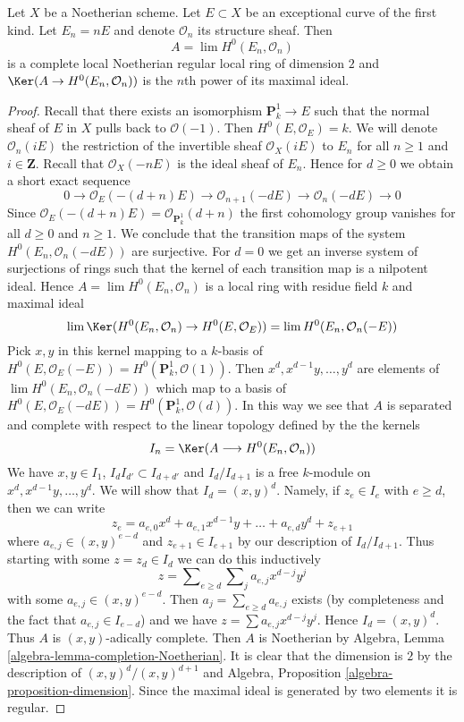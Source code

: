 \begin{lemma}
\label{lemma-exceptional-first-kind-local}
Let $X$ be a Noetherian scheme. Let $E \subset X$ be an
exceptional curve of the first kind. Let $E_n = nE$ and
denote $\mathcal{O}_n$ its structure sheaf. Then
$$
A = \lim H^0(E_n, \mathcal{O}_n)
$$
is a complete local Noetherian regular local ring of dimension $2$
and $\Ker(A \to H^0(E_n, \mathcal{O}_n))$ is the $n$th power of
its maximal ideal.
\end{lemma}

\begin{proof}
Recall that there exists an isomorphism $\mathbf{P}^1_k \to E$
such that the normal sheaf of $E$ in $X$ pulls back to $\mathcal{O}(-1)$.
Then $H^0(E, \mathcal{O}_E) = k$.
We will denote $\mathcal{O}_n(iE)$ the restriction of the invertible
sheaf $\mathcal{O}_X(iE)$ to $E_n$ for all $n \geq 1$ and $i \in \mathbf{Z}$.
Recall that $\mathcal{O}_X(-nE)$ is the ideal sheaf of $E_n$. Hence
for $d \geq 0$ we obtain a short exact sequence
$$
0 \to \mathcal{O}_E(-(d + n)E) \to
\mathcal{O}_{n + 1}(-dE) \to
\mathcal{O}_n(-dE) \to 0
$$
Since $\mathcal{O}_E(-(d + n)E) = \mathcal{O}_{\mathbf{P}^1_k}(d + n)$
the first cohomology group vanishes for all $d \geq 0$ and $n \geq 1$.
We conclude that the transition maps of the system
$H^0(E_n, \mathcal{O}_n(-dE))$ are surjective. For $d = 0$
we get an inverse system of surjections of rings such that the
kernel of each transition map is a nilpotent ideal.
Hence $A = \lim H^0(E_n, \mathcal{O}_n)$ is a local ring
with residue field $k$ and maximal ideal
$$
\lim \Ker(H^0(E_n, \mathcal{O}_n) \to H^0(E, \mathcal{O}_E)) =
\lim H^0(E_n, \mathcal{O}_n(-E))
$$
Pick $x, y$ in this kernel mapping to a $k$-basis of
$H^0(E, \mathcal{O}_E(-E)) = H^0(\mathbf{P}^1_k, \mathcal{O}(1))$.
Then $x^d, x^{d - 1}y, \ldots, y^d$ are
elements of $\lim H^0(E_n, \mathcal{O}_n(-dE))$ which map to a basis
of $H^0(E, \mathcal{O}_E(-dE)) = H^0(\mathbf{P}^1_k, \mathcal{O}(d))$.
In this way we see that $A$ is separated and complete with respect
to the linear topology defined by the the kernels
$$
I_n = \Ker(A \longrightarrow H^0(E_n, \mathcal{O}_n))
$$
We have $x, y \in I_1$, $I_d I_{d'} \subset I_{d + d'}$
and $I_d/I_{d + 1}$ is a free $k$-module on $x^d, x^{d - 1}y, \ldots, y^d$.
We will show that $I_d = (x, y)^d$. Namely, if $z_e \in I_e$ with
$e \geq d$, then we can write
$$
z_e = a_{e, 0} x^d + a_{e, 1} x^{d - 1}y + \ldots + a_{e, d}y^d + z_{e + 1}
$$
where $a_{e, j} \in (x, y)^{e - d}$ and $z_{e + 1} \in I_{e + 1}$
by our description of $I_d/I_{d + 1}$. Thus starting with some
$z = z_d \in I_d$ we can do this inductively
$$
z = \sum\nolimits_{e \geq d} \sum\nolimits_j a_{e, j} x^{d - j} y^j
$$
with some $a_{e, j} \in (x, y)^{e - d}$. Then $a_j = \sum_{e \geq d} a_{e, j}$
exists (by completeness and the fact that $a_{e, j} \in I_{e - d}$)
and we have $z = \sum a_{e, j} x^{d - j} y^j$.
Hence $I_d = (x, y)^d$.
Thus $A$ is $(x, y)$-adically complete. Then $A$ is
Noetherian by Algebra, Lemma \ref{algebra-lemma-completion-Noetherian}.
It is clear that the dimension is $2$ by the description
of $(x, y)^d/(x, y)^{d + 1}$ and
Algebra, Proposition \ref{algebra-proposition-dimension}.
Since the maximal ideal
is generated by two elements it is regular.
\end{proof}

